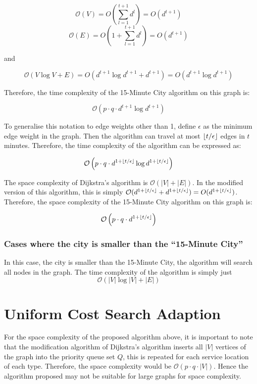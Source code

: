 $$\mathcal{O}(V)=O(\sum_{l=1}^{t+1} d^l)=O(d^{t+1})$$
$$\mathcal{O}(E)=O(1+\sum_{l=1}^{t+1} d^l)=O(d^{t+1})$$

and

$$\mathcal{O}(V\log V+E)=O(d^{t+1}\log d^{t+1}+d^{t+1})=O(d^{t+1}\log d^{t+1})$$

Therefore, the time complexity of the 15-Minute City algorithm on this graph is:

$$\mathcal{O}\left(p\cdot q\cdot d^{t+1}\log d^{t+1}\right)$$

To generalise this notation to edge weights other than 1, define $\epsilon$ as the minimum edge weight in the graph. Then the algorithm can travel at most $\floor*{t/\epsilon}$ edges in $t$ minutes. Therefore, the time complexity of the algorithm can be expressed as:

$$\mathcal{O}\left(p\cdot q\cdot d^{1+\floor*{t/\epsilon}}\log d^{1+\floor*{t/\epsilon}}\right)$$

The space complexity of Dijkstra's algorithm is $\mathcal{O}(|V|+|E|)$. In the modified version of this algorithm, this is simply $\mathcal{O}(d^{1+\floor*{t/\epsilon}}+d^{1+\floor*{t/\epsilon}}) = O(d^{1+\floor*{t/\epsilon}})$. Therefore, the space complexity of the 15-Minute City algorithm on this graph is:

$$\mathcal{O}\left(p\cdot q\cdot d^{1+\floor*{t/\epsilon}}\right)$$

\subsubsection{Cases where the city is smaller than the ``15-Minute City''}

In this case, the city is smaller than the 15-Minute City, the algorithm will search all nodes in the graph. The time complexity of the algorithm is simply just $$\mathcal{O}(|V|\log |V|+|E|)$$

\section{Uniform Cost Search Adaption}

For the space complexity of the proposed algorithm above, it is important to note that the modification algorithm of Dijkstra's algorithm inserts all $|V|$ vertices of the graph into the priority queue set $Q$, this is repeated for each service location of each type. Therefore, the space complexity would be $\mathcal{O}(p\cdot q\cdot |V|)$. Hence the algorithm proposed may not be suitable for large graphs for space complexity.

